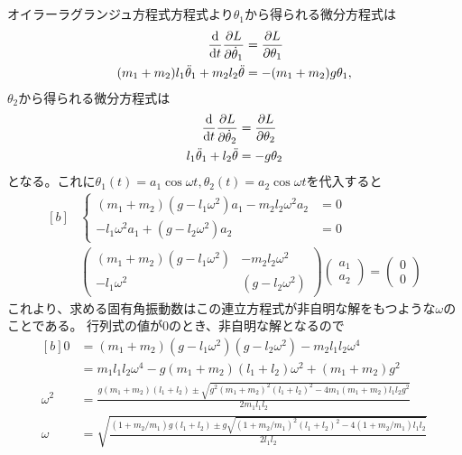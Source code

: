 \documentclass[../../sp_2016.tex]{subfiles}
\begin{document}
\subsection{}
オイラーラグランジュ方程式方程式より\(\theta_1\)から得られる微分方程式は
\begin{equation}\begin{aligned}[b]
    \dv{t} \pdv{L}{\dot{\theta}_1} &= \pdv{L}{\theta_1}\\
    (m_1+m_2)l_1\ddot{\theta}_1+m_2l_2\ddot{\theta} &=-(m_1+m_2)g\theta_1,
\end{aligned}\end{equation}
\(\theta_2\)から得られる微分方程式は
\begin{equation}\begin{aligned}[b]
    \dv{t} \pdv{L}{\dot{\theta}_2} &= \pdv{L}{\theta_2}\\
    l_1\ddot{\theta}_1+l_2\ddot{\theta} &=-g\theta_2
\end{aligned}\end{equation}
となる。これに\(\theta_1(t)=a_1\cos\omega t,\theta_2(t)=a_2\cos\omega t\)を代入すると
\begin{equation}\begin{aligned}[b]
    &\begin{cases}
        (m_1+m_2)(g-l_1\omega^2)a_1-m_2l_2\omega^2 a_2 &=0\\
        -l_1\omega^2 a_1 +(g-l_2\omega^2)a_2 &= 0
    \end{cases}\\
    &\begin{pmatrix}
        (m_1+m_2)(g-l_1 \omega^2) & -m_2l_2\omega^2\\
        -l_1\omega^2 &(g-l_2\omega^2)
    \end{pmatrix}\begin{pmatrix}
        a_1\\a_2
    \end{pmatrix}=\begin{pmatrix}
        0 \\ 0
    \end{pmatrix}
\end{aligned}\end{equation}
これより、求める固有角振動数はこの連立方程式が非自明な解をもつような\(\omega\)のことである。
行列式の値が0のとき、非自明な解となるので
\begin{equation}\begin{aligned}[b]
    0 &= (m_1+m_2)(g-l_1\omega^2)(g-l_2\omega^2)-m_2l_1l_2\omega^4\\
    &=m_1l_1l_2\omega^4-g(m_1+m_2)(l_1+l_2)\omega^2+(m_1+m_2)g^2\\
    \omega^2 &= \frac{g(m_1+m_2)(l_1+l_2)\pm\sqrt{g^2(m_1+m_2)^2(l_1+l_2)^2-4m_1(m_1+m_2)l_1l_2g^2}}{2m_1l_1l_2}\\
    \omega &= \sqrt{\frac{(1+m_2/m_1)g(l_1+l_2)\pm g\sqrt{(1+m_2/m_1)^2(l_1+l_2)^2-4(1+m_2/m_1)l_1l_2}}{2l_1l_2}}
\end{aligned}\end{equation}
\end{document}
